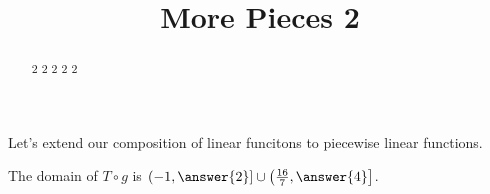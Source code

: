 \documentclass{ximera}
\title {More Pieces 2}
\begin{document}
\begin{abstract}
2 2 2 2 2 
\end{abstract}
\maketitle





Let's extend our composition of linear funcitons to piecewise linear functions.


\begin{problem}
The domain of $T \circ g$ is $\left( -1, \answer{2} \right] \cup \left( \frac{16}{7}, \answer{4} \right]$.

\end{problem}
\end{document}
